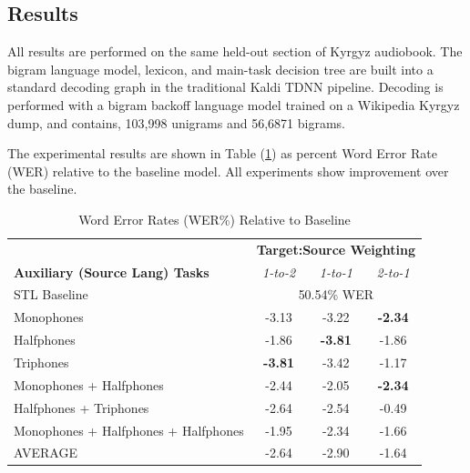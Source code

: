 \documentclass[a4paper]{article}
\begin{document}
\subsection{Results}


All results are performed on the same held-out section of Kyrgyz audiobook. The bigram language model, lexicon, and main-task decision tree are built into a standard decoding graph in the traditional Kaldi TDNN pipeline. Decoding is performed with a bigram backoff language model trained on a Wikipedia Kyrgyz dump, and contains, 103,998 unigrams and 56,6871 bigrams.

The experimental results are shown in Table (\ref{tab:results}) as percent Word Error Rate (WER) relative to the baseline model. All experiments show improvement over the baseline.

\begin{table}[!htbp]
  \centering
  \caption{Word Error Rates (WER\%) Relative to Baseline}
    \label{tab:results}
  \begin{adjustbox}{width=.45\textwidth}
    \begin{tabular}{lccc}
      \toprule
      & \multicolumn{3}{c}{\textbf{Target:Source Weighting}} \\
      \textbf{Auxiliary (Source Lang) Tasks} & \textit{1-to-2} & \textit{1-to-1} & \textit{2-to-1}\\
      \midrule
      STL Baseline                          &  \multicolumn{3}{c}{50.54\% WER}  \\
      Monophones                            &  -3.13  & -3.22 & \textbf{-2.34}  \\
      Halfphones                            &  -1.86  & \textbf{-3.81} & -1.86 \\
      Triphones                             &  \textbf{-3.81} & -3.42 & -1.17  \\
      Monophones + Halfphones               &  -2.44  & -2.05 &  \textbf{-2.34}\\
      Halfphones + Triphones                &  -2.64  & -2.54 & -0.49 \\
      Monophones + Halfphones + Halfphones  &  -1.95  & -2.34 &  -1.66\\
      \midrule
      AVERAGE                               &  -2.64  & -2.90 & -1.64 \\
      \bottomrule
    \end{tabular}
  \end{adjustbox}
\end{table}
\end{document}
